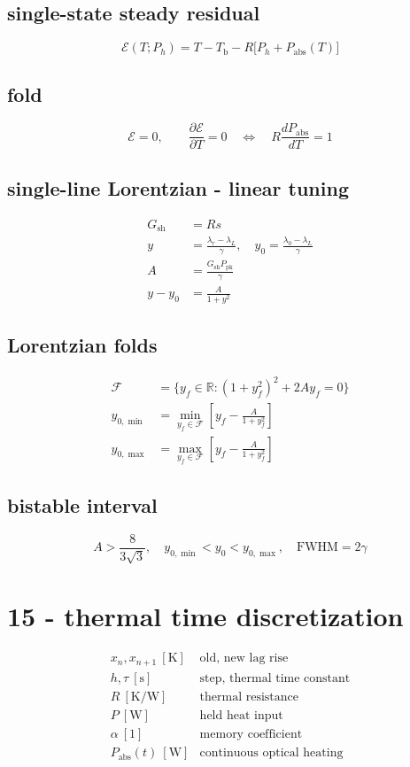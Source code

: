 \subsection*{single-state steady residual}
\[
\displaystyle \mathcal E(T;P_h)=T-T_{\mathrm b}-R\bigl[P_h+P_{\mathrm{abs}}(T)\bigr]
\]

\subsection*{fold}
\[
\displaystyle \mathcal E=0,\qquad\frac{\partial\mathcal E}{\partial T}=0\quad\Longleftrightarrow\quad R\frac{dP_{\mathrm{abs}}}{dT}=1
\]

\subsection*{single-line Lorentzian - linear tuning}
\[
\displaystyle \begin{aligned}G_{\mathrm{sh}}&=Rs\\y&=\frac{\lambda_r-\lambda_L}{\gamma},\quad y_0=\frac{\lambda_0-\lambda_L}{\gamma}\\A&=\frac{G_{\mathrm{sh}}P_{\mathrm{pk}}}{\gamma}\\y-y_0&=\frac{A}{1+y^2}\end{aligned}
\]

\subsection*{Lorentzian folds}
\[
\displaystyle \begin{aligned}\mathcal F&=\{y_f\in\mathbb R:(1+y_f^2)^2+2Ay_f=0\}\\y_{0,\min}&=\min_{y_f\in\mathcal F}\left[y_f-\frac A{1+y_f^2}\right]\\y_{0,\max}&=\max_{y_f\in\mathcal F}\left[y_f-\frac A{1+y_f^2}\right]\end{aligned}
\]

\subsection*{bistable interval}
\[
\displaystyle A>\frac{8}{3\sqrt3},\quad y_{0,\min}<y_0<y_{0,\max},\quad\mathrm{FWHM}=2\gamma
\]

\clearpage
\section*{15 - thermal time discretization}

\[
\begin{array}{ll}x_n,x_{n+1}\ [\mathrm K]&\text{old, new lag rise}\\[0.6em]h,\tau\ [\mathrm s]&\text{step, thermal time constant}\\[0.6em]R\ [\mathrm{K/W}]&\text{thermal resistance}\\[0.6em]P\ [\mathrm W]&\text{held heat input}\\[0.6em]\alpha\ [1]&\text{memory coefficient}\\[0.6em]P_{\mathrm{abs}}(t)\ [\mathrm W]&\text{continuous optical heating}\end{array}
\]

